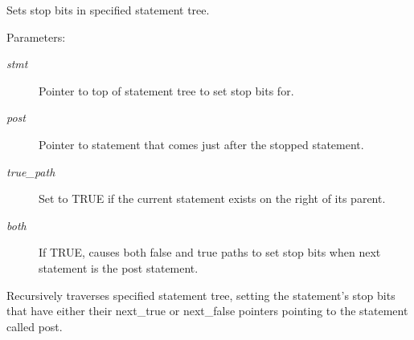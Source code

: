 Sets stop bits in specified statement tree. 

\begin{Desc}
\item[Parameters:]
\begin{description}
\item[{\em stmt}]Pointer to top of statement tree to set stop bits for. \item[{\em post}]Pointer to statement that comes just after the stopped statement. \item[{\em true\_\-path}]Set to TRUE if the current statement exists on the right of its parent. \item[{\em both}]If TRUE, causes both false and true paths to set stop bits when next statement is the post statement.\end{description}
\end{Desc}
Recursively traverses specified statement tree, setting the statement's stop bits that have either their next\_\-true or next\_\-false pointers pointing to the statement called post. 